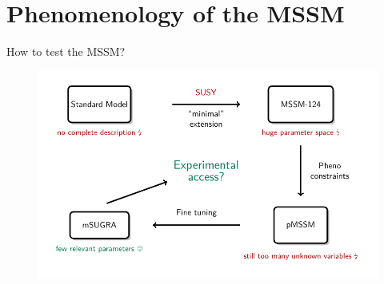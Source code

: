 \section{Phenomenology of the MSSM}
\begin{frame}{How to test the MSSM?}
\addtocounter{framenumber}{-1}
\begin{figure}
	\centering 
	\includegraphics[scale = 0.9]{figures/overview}
\end{figure}
\end{frame}


